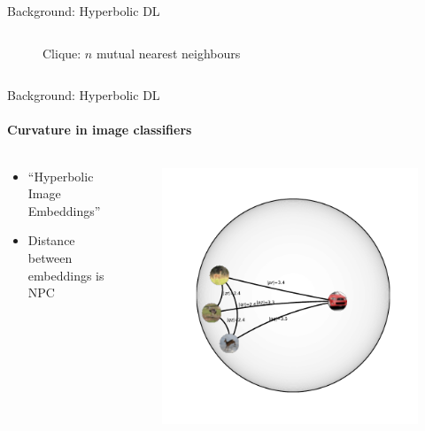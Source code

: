 \documentclass{beamer}
\begin{document}
\begin{frame}{Background: Hyperbolic DL}
\begin{columns}
\begin{column}{.45\linewidth}
\begin{figure}
                \caption{Clique: \( n \) mutual nearest neighbours}
            \end{figure}
        \end{column}
    \end{columns}
\end{frame}

\begin{frame}{Background: Hyperbolic DL}
    \framesubtitle{Curvature in image classifiers}

    \begin{columns}
        \begin{column}{.5\linewidth}
            \begin{itemize}
                    \item ``Hyperbolic Image Embeddings''
                    \item Distance between embeddings is NPC
            \end{itemize}
        \end{column}
        \begin{column}{.5\linewidth}
            \begin{figure}\centering
                \includegraphics[width=.95\linewidth]{art/quadruple-8.pdf}
            \end{figure}
        \end{column}
    \end{columns}
\end{frame}
\end{document}
